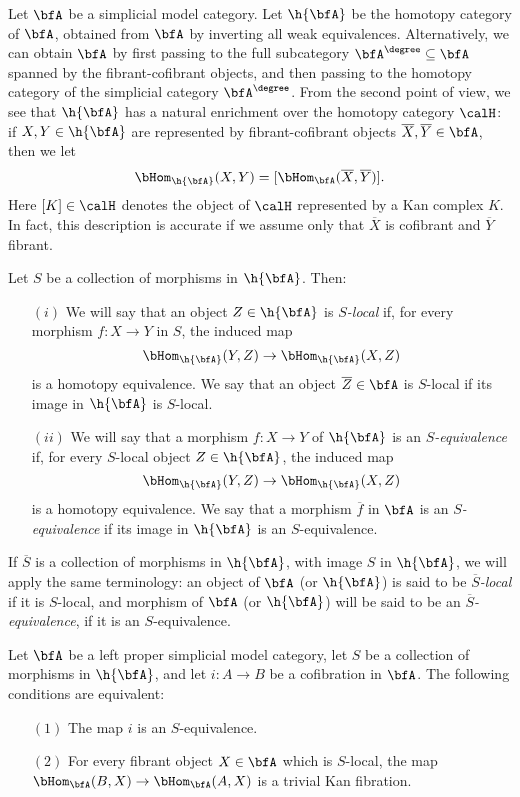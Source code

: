 Let $\bfA$ be a simplicial model category. Let $\h{\bfA}$ be the homotopy category of $\bfA$, obtained from $\bfA$ by inverting all weak equivalences. Alternatively, we can obtain $\bfA$ by first passing to the full subcategory $\bfA^{\degree} \subseteq \bfA$ spanned by the fibrant-cofibrant objects, and then passing to the homotopy category of the simplicial category $\bfA^{\degree}$. From the second point of view, we see that $\h{\bfA}$ has a natural enrichment over the homotopy category $\calH$: if $X, Y \in \h{\bfA}$ are represented by fibrant-cofibrant objects
$\overline{X}, \overline{Y} \in \bfA$, then we let
$$ \bHom_{ \h{\bfA}}(X,Y) = [ \bHom_{\bfA}(\overline{X}, \overline{Y}) ].$$
Here $[K] \in \calH$ denotes the object of $\calH$ represented by a Kan complex $K$. In fact, this description is accurate if we assume only that $\overline{X}$ is cofibrant and $\overline{Y}$ fibrant.

Let $S$ be a collection of morphisms in $\h{\bfA}$. Then:
\begin{itemize}
\item[$(i)$] We will say that an object $Z \in \h{\bfA}$ is 
{\it $S$-local} if, for every morphism $f: X \rightarrow Y$ in $S$, the induced map
$$ \bHom_{\h{\bfA}}( Y, Z) \rightarrow \bHom_{\h{\bfA}}( X, Z)$$ is a homotopy equivalence. We say that an object $\overline{Z} \in \bfA$ is $S$-local if its image in
$\h{\bfA}$ is $S$-local.
\item[$(ii)$] We will say that a morphism $f: X \rightarrow Y$ of $\h{\bfA}$ is an {\it $S$-equivalence} if, for every $S$-local object $Z \in \h{\bfA}$, the induced map
$$ \bHom_{\h{\bfA}}( Y, Z) \rightarrow \bHom_{\h{\bfA}}( X, Z)$$ is a homotopy equivalence. We say that a morphism $\overline{f}$ in $\bfA$ is an {\it $S$-equivalence} if its image in $\h{\bfA}$ is an $S$-equivalence.
\end{itemize}
If $\overline{S}$ is a collection of morphisms in $\h{\bfA}$, with image $S$ in $\h{\bfA}$, we will apply the same terminology: an object of $\bfA$ (or $\h{\bfA}$) is said to be {\it $\overline{S}$-local} if it is $S$-local, and morphism of $\bfA$ (or $\h{\bfA}$) will be said to be an {\it $\overline{S}$-equivalence}, if it is an $S$-equivalence.

\begin{lemma}\label{mtomp}
Let $\bfA$ be a left proper simplicial model category, let $S$ be a collection of morphisms
in $\h{\bfA}$, and let $i: A \rightarrow B$ be a cofibration in $\bfA$. The following conditions are equivalent:
\begin{itemize}
\item[$(1)$] The map $i$ is an $S$-equivalence.
\item[$(2)$] For every fibrant object $X \in \bfA$ which is $S$-local, the map
$\bHom_{\bfA}(B, X) \rightarrow \bHom_{\bfA}(A,X)$ is a trivial Kan fibration.
\end{itemize}
\end{lemma}

